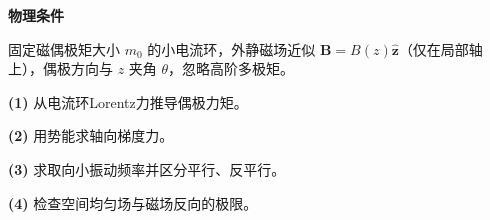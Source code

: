 \textbf{物理条件}\par 固定磁偶极矩大小 \(m_0\) 的小电流环，外静磁场近似 \(\boldsymbol B=B(z)\hat{\boldsymbol z}\)（仅在局部轴上），偶极方向与 \(z\) 夹角 \(\theta\)，忽略高阶多极矩。
\par\noindent\textbf{(1)} 从电流环Lorentz力推导偶极力矩。
\par\noindent\textbf{(2)} 用势能求轴向梯度力。
\par\noindent\textbf{(3)} 求取向小振动频率并区分平行、反平行。
\par\noindent\textbf{(4)} 检查空间均匀场与磁场反向的极限。
